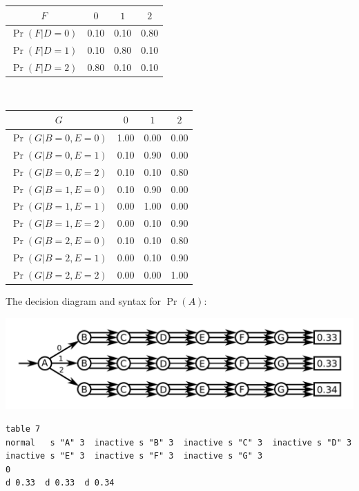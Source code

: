 \documentclass{article}
\begin{document}
\begin{tabular}{|c||c|c|c|}
\hline
\(F\) & \(0\) & \(1\) & \(2\) \\
\hline
\hline
\(\Pr(F|D=0)\) & 0.10 & 0.10 & 0.80 \\ 
\hline
\(\Pr(F|D=1)\) & 0.10 & 0.80 & 0.10 \\ 
\hline
\(\Pr(F|D=2)\) & 0.80 & 0.10 & 0.10 \\ 
\hline
\end{tabular}
~
\begin{tabular}{|c||c|c|c|}
\hline
\(G\) & \(0\) & \(1\) & \(2\) \\ 
\hline
\hline
\(\Pr(G|B=0,E=0)\) & 1.00 & 0.00 & 0.00 \\
\hline
\(\Pr(G|B=0,E=1)\) & 0.10 & 0.90 & 0.00 \\
\hline
\(\Pr(G|B=0,E=2)\) & 0.10 & 0.10 & 0.80 \\
\hline
\(\Pr(G|B=1,E=0)\) & 0.10 & 0.90 & 0.00 \\
\hline
\(\Pr(G|B=1,E=1)\) & 0.00 & 1.00 & 0.00 \\
\hline
\(\Pr(G|B=1,E=2)\) & 0.00 & 0.10 & 0.90 \\
\hline
\(\Pr(G|B=2,E=0)\) & 0.10 & 0.10 & 0.80 \\
\hline
\(\Pr(G|B=2,E=1)\) & 0.00 & 0.10 & 0.90 \\
\hline
\(\Pr(G|B=2,E=2)\) & 0.00 & 0.00 & 1.00 \\
\hline
\end{tabular}

\vspace{5mm}

\begin{minipage}{\textwidth}
The decision diagram and syntax for \(\Pr(A)\):

\includegraphics[width = \textwidth]{Pr(A)}

\begin{verbatim}
table 7 
normal   s "A" 3  inactive s "B" 3  inactive s "C" 3  inactive s "D" 3 
inactive s "E" 3  inactive s "F" 3  inactive s "G" 3 
0 
d 0.33  d 0.33  d 0.34 
\end{verbatim} 
\end{minipage}
\end{document}

